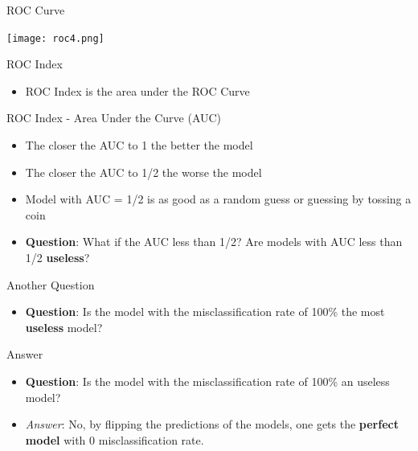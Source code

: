\documentclass[
  ignorenonframetext,
]{beamer}
\providecommand{\tightlist}{%
  \setlength{\itemsep}{0pt}\setlength{\parskip}{0pt}}
\begin{document}
\begin{frame}{ROC Curve}
\protect\hypertarget{roc-curve-4}{}

\texttt{[image: roc4.png]}

\end{frame}

\begin{frame}{ROC Index}
\protect\hypertarget{roc-index}{}

\begin{itemize}
\tightlist
\item
  ROC Index is the area under the ROC Curve
\end{itemize}

\end{frame}

\begin{frame}{ROC Index - Area Under the Curve (AUC)}
\protect\hypertarget{roc-index---area-under-the-curve-auc}{}

\begin{itemize}
\item
  The closer the AUC to 1 the better the model
\item
  The closer the AUC to 1/2 the worse the model
\item
  Model with AUC = 1/2 is as good as a random guess or guessing by
  tossing a coin
\item
  \textbf{Question}: What if the AUC less than 1/2? Are models with AUC
  less than 1/2 \textbf{useless}?
\end{itemize}

\end{frame}

\begin{frame}{Another Question}
\protect\hypertarget{another-question}{}

\begin{itemize}
\tightlist
\item
  \textbf{Question}: Is the model with the misclassification rate of
  100\% the most \textbf{useless} model?
\end{itemize}

\end{frame}

\begin{frame}{Answer}
\protect\hypertarget{answer}{}

\begin{itemize}
\tightlist
\item
  \textbf{Question}: Is the model with the misclassification rate of
  100\% an useless model?
\item
  \emph{Answer}: No, by flipping the predictions of the models, one gets
  the \textbf{perfect model} with 0 misclassification rate.
\end{itemize}

\end{frame}
\end{document}
